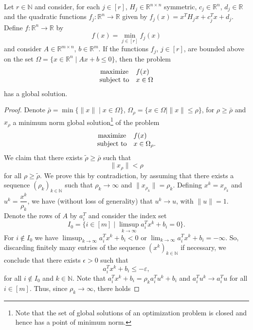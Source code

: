 \documentclass[smallextended,referee,envcountsect]{svjour3}
\newcommand{\R}{\mathbb{R}}
\newcommand{\N}{\mathbb{N}}
\begin{document}
\begin{theorem}
\label{th:exist_piecewise_quad}
Let $r\in\N$ and consider, for each $j\in[r]$, $H_j\in\R^{n\times n}$ symmetric, 
$c_j\in\R^n$, $d_j\in\R$ and the quadratic functions $f_j:\R^n\to\R$ given by 
$f_j(x)=x^TH_jx+c_j^Tx+d_j$. Define $f:\R^n\to\R$ by 
$$
f(x)=\min_{j\in[r]}f_j(x)
$$
and consider $A\in\R^{m\times n}$, $b\in\R^m$. If the functions $f_j$, $j\in[r]$, are 
bounded above on the set $\Omega=\{x\in\R^n\mid Ax+b\leq 0\}$, then the problem 
$$
\begin{array}{cl}
\displaystyle{\rm maximize } & f(x) \\
{\rm subject\ to} & x\in\Omega
\end{array}
$$
has a global solution.
\end{theorem}
\begin{proof}
Denote $\bar\rho=\min\{\|x\|\mid x\in\Omega\}$, 
$\Omega_\rho=\{x\in\Omega\mid\|x\|\leq\rho\}$, for $\rho\geq\bar\rho$ and $x_\rho$ a 
minimum norm global solution\footnote{Note that the set of global solutions of an 
optimization problem is closed and hence has a point of minimum norm.} of the problem 
$$
\begin{array}{cl}
\displaystyle{\rm maximize } & f(x) \\
{\rm subject\ to} & x\in\Omega_\rho.
\end{array}
$$
We claim that there exists $\tilde\rho\geq\bar\rho$ such that 
\begin{equation}
\label{xrho_inactive}
\|x_\rho\|<\rho
\end{equation}
for all $\rho\geq\tilde\rho$. We prove this by contradiction, by assuming that there 
exists a sequence $(\rho_k)_{k\in\N}$ such that $\rho_k\to\infty$ and 
$\|x_{\rho_k}\|=\rho_k$. Defining $x^k=x_{\rho_k}$ and $u^k=\dfrac{x^k}{\rho_k}$, we 
have (without loss of generality) that $u^k\to u$, with $\|u\|=1$. Denote the rows of 
$A$ by $a_i^T$ and consider the index set 
$$
I_0=\Big\{i\in[m]\mid\limsup_{k\to\infty}a_i^Tx^k+b_i=0\Big\}.
$$ 
For $i\notin I_0$ we have $\displaystyle\limsup_{k\to\infty}a_i^Tx^k+b_i<0$ or 
$\displaystyle\lim_{k\to\infty}a_i^Tx^k+b_i=-\infty$. So, discarding finitely many 
entries of the sequence $(x^k)_{k\in\N}$ if necessary, we conclude that there exists 
$\epsilon>0$ such that 
\begin{equation}
\label{bd_away}
a_i^Tx^k+b_i\leq-\varepsilon,
\end{equation}
for all $i\notin I_0$ and $k\in\N$. Note that $a_i^Tx^k+b_i=\rho_ka_i^Tu^k+b_i$ and 
$a_i^Tu^k\to a_i^Tu$ for all $i\in[m]$. Thus, since $\rho_k\to\infty$, there holds 

\end{proof}
\end{document}
